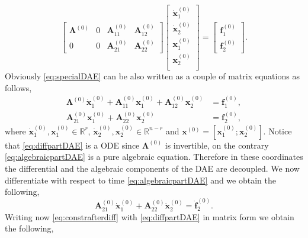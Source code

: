 		\begin{equation}
			\label{eq:specialDAE}
			\begin{bmatrix}
				\bm{\Lambda}^{(0)}	& 0 & \bm{A}_{11}^{(0)} 	& \bm{A}_{12}^{(0)} \\
				0 					& 0 & \bm{A}_{21}^{(0)}  	& \bm{A}_{22}^{(0)}
			\end{bmatrix}
			\begin{bmatrix}
				\dot{\bm{x}}_{1}^{(0)}\\
				\dot{\bm{x}}_{2}^{(0)}\\
				\bm{x}_{1}^{(0)}\\
				\bm{x}_{2}^{(0)} \\
			\end{bmatrix}
			= 
			\begin{bmatrix}
				\bm{f}_{1}^{(0)}\\
				\bm{f}_{2}^{(0)}
			\end{bmatrix}.
		\end{equation}
		Obviously \cref{eq:specialDAE} can be also written as a couple of matrix equations as follows,
		\begin{subequations}
			\begin{align}
				\label{eq:diffpartDAE}
				\bm{\Lambda}^{(0)}\dot{\bm{x}}_{1}^{(0)} + \bm{A}_{11}^{(0)}\bm{x}_{1}^{(0)} + \bm{A}_{12}^{(0)}\bm{x}_2^{(0)} &= \bm{f}_{1}^{(0)}, \\
				\label{eq:algebraicpartDAE}
				\bm{A}_{21}^{(0)}\bm{x}_{1}^{(0)} + \bm{A}_{22}^{(0)}\bm{x}_{2}^{(0)} &= \bm{f}_{2}^{(0)},
			\end{align}
		\end{subequations}
		where $\dot{\bm{x}}_{1}^{(0)},\bm{x}_{1}^{(0)}\in\mathbb{R}^{r}$, $\dot{\bm{x}}_{2}^{(0)},\bm{x}_{2}^{(0)}\in\mathbb{R}^{n-r}$ and $\bm{x}^{(0)} = [\bm{x}_{1}^{(0)}; \bm{x}_{2}^{(0)}]$. Notice that \cref{eq:diffpartDAE} is a ODE since $\bm{\Lambda}^{(0)}$ is invertible, on the contrary \cref{eq:algebraicpartDAE} is a pure algebraic equation. Therefore in these coordinates the differential and the algebraic components of the DAE are decoupled. We now differentiate with respect to time \cref{eq:algebraicpartDAE} and we obtain the following, 
		\begin{equation}
			\label{eq:constrafterdiff}
			\bm{A}_{21}^{(0)}\dot{\bm{x}}_{1}^{(0)} + \bm{A}_{22}^{(0)}\dot{\bm{x}}_{2}^{(0)} = \dot{\bm{f}}_{2}^{(0)}.
		\end{equation} 
		Writing now \cref{eq:constrafterdiff} with \cref{eq:diffpartDAE} in matrix form we obtain the following, 
